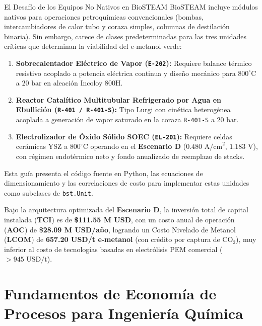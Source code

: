\documentclass[11pt,letterpaper]{article}
\begin{document}
\begin{warningbox}{El Desafío de los Equipos No Nativos en BioSTEAM}
BioSTEAM incluye módulos nativos para operaciones petroquímicas convencionales (bombas, intercambiadores de calor tubo y coraza simples, columnas de destilación binaria). Sin embargo, carece de clases predeterminadas para las tres unidades críticas que determinan la viabilidad del e-metanol verde:
\begin{enumerate}
    \item \textbf{Sobrecalentador Eléctrico de Vapor (\texttt{E-202}):} Requiere balance térmico resistivo acoplado a potencia eléctrica continua y diseño mecánico para $800^\circ\text{C}$ a $20\text{ bar}$ en aleación Incoloy 800H.
    \item \textbf{Reactor Catalítico Multitubular Refrigerado por Agua en Ebullición (\texttt{R-401 / R-401-S}):} Tipo Lurgi con cinética heterogénea acoplada a generación de vapor saturado en la coraza \texttt{R-401-S} a $20\text{ bar}$.
    \item \textbf{Electrolizador de Óxido Sólido SOEC (\texttt{EL-201}):} Requiere celdas cerámicas YSZ a $800^\circ\text{C}$ operando en el \textbf{Escenario D} ($0.480\text{ A/cm}^2$, $1.183\text{ V}$), con régimen endotérmico neto y fondo anualizado de reemplazo de stacks.
\end{enumerate}
Esta guía presenta el código fuente en Python, las ecuaciones de dimensionamiento y las correlaciones de costo para implementar estas unidades como subclases de \texttt{bst.Unit}.
\end{warningbox}

Bajo la arquitectura optimizada del \textbf{Escenario D}, la inversión total de capital instalada (\textbf{TCI}) es de \textbf{\$111.55 M USD}, con un costo anual de operación (\textbf{AOC}) de \textbf{\$28.09 M USD/año}, logrando un Costo Nivelado de Metanol (\textbf{LCOM}) de \textbf{657.20 USD/t e-metanol} (con crédito por captura de $\text{CO}_2$), muy inferior al costo de tecnologías basadas en electrólisis PEM comercial ($> 945\text{ USD/t}$).

\newpage

\section{Fundamentos de Economía de Procesos para Ingeniería Química}
\end{document}

